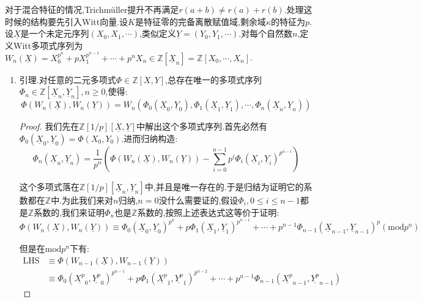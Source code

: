 对于混合特征的情况,Trichm\"uller提升不再满足$r(a+b)\not=r(a)+r(b)$.处理这时候的结构要先引入Witt向量.设$K$是特征零的完备离散赋值域,剩余域$\kappa$的特征为$p$.设$\underline{X}$是一个未定元序列$(X_0,X_1,\cdots)$,类似定义$\underline{Y}=(Y_0,Y_1,\cdots)$.对每个自然数$n$,定义Witt多项式序列为$W_n(\underline{X})=X_0^{p^n}+pX_1^{p^{n-1}}+\cdots+p^nX_n\in\mathbb{Z}[\underline{X}_n]=\mathbb{Z}[X_0,\cdots,X_n]$.
\begin{enumerate}
	\item 引理.对任意的二元多项式$\Phi\in\mathbb{Z}[X,Y]$,总存在唯一的多项式序列$\Phi_n\in\mathbb{Z}[\underline{X}_n,\underline{Y}_n],n\ge0$,使得:
	$$\Phi(W_n(\underline{X}),W_n(\underline{Y}))=W_n(\Phi_0(\underline{X}_0,\underline{Y}_0),\Phi_1(\underline{X}_1,\underline{Y}_1),\cdots,\Phi_n(\underline{X}_n,\underline{Y}_n))$$
	\begin{proof}
		
		我们先在$\mathbb{Z}[1/p][\underline{X},\underline{Y}]$中解出这个多项式序列.首先必然有$\Phi_0(\underline{X}_0,\underline{Y}_0)=\Phi(X_0,Y_0)$.进而归纳构造:
		$$\Phi_n(\underline{X}_n,\underline{Y}_n)=\frac{1}{p^n}\left(\Phi\left(W_n(\underline{X}),W_n(\underline{Y})\right)-\sum_{i=0}^{n-1}p^i\Phi_i(\underline{X}_i,\underline{Y}_i)^{p^{n-i}}\right)$$
		
		这个多项式落在$\mathbb{Z}[1/p][\underline{X}_n,\underline{Y}_n]$中,并且是唯一存在的.于是归结为证明它的系数都在$\mathbb{Z}$中.为此我们来对$n$归纳,$n=0$没什么需要证的,假设$\Phi_i,0\le i\le n-1$都是$\mathbb{Z}$系数的,我们来证明$\Phi_n$也是$\mathbb{Z}$系数的,按照上述表达式这等价于证明:
		$$\Phi(W_n(\underline{X}),W_n(\underline{Y}))\equiv\Phi_0(\underline{X}_0,\underline{Y}_0)^{p^n}+p\Phi_1(\underline{X}_1,\underline{Y}_1)^{p^{n-1}}+\cdots+p^{n-1}\Phi_{n-1}(\underline{X}_{n-1},\underline{Y}_{n-1})^p\left(\mathrm{mod}p^n\right)$$
		
		但是在$\mathrm{mod}p^n$下有:
		\begin{align*}
			\mathrm{LHS}&\equiv\Phi(W_{n-1}(\underline{X}),W_{n-1}(\underline{Y}))\\&\equiv\Phi_0(\underline{X^p}_0,\underline{Y^p}_0)^{p^{n-1}}+p\Phi_1(\underline{X^p}_1,\underline{Y^p}_1)^{p^{n-2}}+\cdots+p^{n-1}\Phi_{n-1}(\underline{X^p}_{n-1},\underline{Y^p}_{n-1})
		\end{align*}
		

\end{proof}
\end{enumerate}
